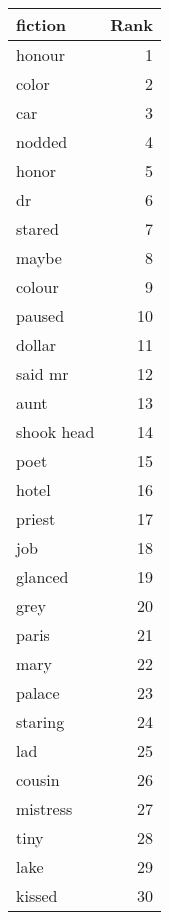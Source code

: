 \begin{table}
\label{tab:fiction_terms}
\begin{tabular}{lr}
\toprule
fiction & Rank \\
\midrule
honour & 1 \\
color & 2 \\
car & 3 \\
nodded & 4 \\
honor & 5 \\
dr & 6 \\
stared & 7 \\
maybe & 8 \\
colour & 9 \\
paused & 10 \\
dollar & 11 \\
said mr & 12 \\
aunt & 13 \\
shook head & 14 \\
poet & 15 \\
hotel & 16 \\
priest & 17 \\
job & 18 \\
glanced & 19 \\
grey & 20 \\
paris & 21 \\
mary & 22 \\
palace & 23 \\
staring & 24 \\
lad & 25 \\
cousin & 26 \\
mistress & 27 \\
tiny & 28 \\
lake & 29 \\
kissed & 30 \\
\bottomrule
\end{tabular}
\end{table}
